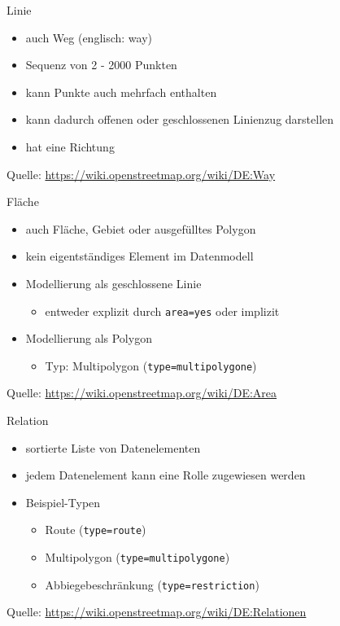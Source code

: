 \documentclass{beamer}
\begin{document}
\begin{frame}[fragile]{Linie}
\begin{itemize}
  \item auch Weg (englisch: way)
  \item Sequenz von 2 - 2000 Punkten
  \item kann Punkte auch mehrfach enthalten
  \item kann dadurch offenen oder geschlossenen Linienzug darstellen
  \item hat eine Richtung
\end{itemize}

Quelle: \url{https://wiki.openstreetmap.org/wiki/DE:Way}

\end{frame}
\begin{frame}[fragile]{Fläche}

\begin{itemize}
  \item auch Fläche, Gebiet oder ausgefülltes Polygon
  \item kein eigentständiges Element im Datenmodell
  \item Modellierung als geschlossene Linie
  \begin{itemize}
    \item entweder explizit durch \texttt{area=yes} oder implizit
  \end{itemize}
  \item Modellierung als Polygon
  \begin{itemize}
    \item Typ: Multipolygon (\texttt{type=multipolygone})
  \end{itemize}
\end{itemize}
Quelle: \url{https://wiki.openstreetmap.org/wiki/DE:Area}
\end{frame}
\begin{frame}{Relation}
\begin{itemize}
  \item sortierte Liste von Datenelementen
  \item jedem Datenelement kann eine Rolle zugewiesen werden
  \item Beispiel-Typen
  \begin{itemize}
    \item Route (\texttt{type=route})
    \item Multipolygon (\texttt{type=multipolygone})
    \item Abbiegebeschränkung (\texttt{type=restriction})
   \end{itemize}
\end{itemize}
Quelle: \url{https://wiki.openstreetmap.org/wiki/DE:Relationen}
\end{frame}
\end{document}
